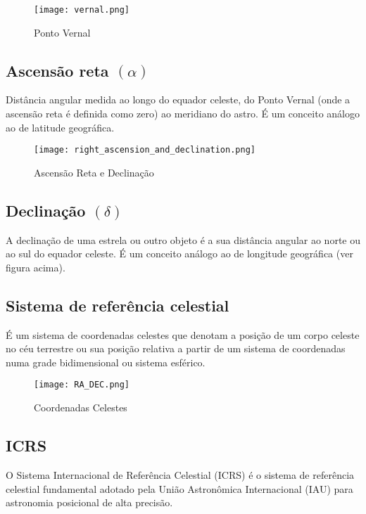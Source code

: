 \documentclass[12pt, a4paper]{article}
\begin{document}
	\begin{figure}[H]
		\centering
		\texttt{[image: vernal.png]}
		\caption{Ponto Vernal}
	\end{figure}

	\subsection{Ascensão reta $(\alpha)$}
	
	Distância angular medida ao longo do equador celeste, do Ponto Vernal (onde a ascensão reta é definida como zero) ao meridiano do astro. É um conceito análogo ao de latitude geográfica.

	\begin{figure}[H]
		\centering
		\texttt{[image: right\_ascension\_and\_declination.png]}
		\caption{Ascensão Reta e Declinação}
	\end{figure}

	\subsection{Declinação $(\delta)$}
	A declinação de uma estrela ou outro objeto é a sua distância angular ao norte ou ao sul do equador celeste. É um conceito análogo ao de longitude geográfica (ver figura acima).

	\subsection{Sistema de referência celestial}
	
	É um sistema de coordenadas celestes que denotam a posição de um corpo celeste no céu terrestre ou sua posição relativa a partir de um sistema de coordenadas numa grade bidimensional ou sistema esférico.
	
	\begin{figure}[H]
		\centering
		\texttt{[image: RA\_DEC.png]}
		\caption{Coordenadas Celestes}
	\end{figure}

	\subsection{ICRS}
	
	O Sistema Internacional de Referência Celestial (ICRS) é o sistema de referência celestial fundamental adotado pela União Astronômica Internacional (IAU) para astronomia posicional de alta precisão.
	
\end{document}
